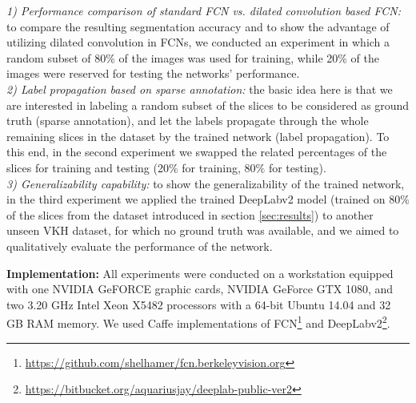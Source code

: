\documentclass[a4paper]{mva_style}
\begin{document}
\textit{1) Performance comparison of standard FCN vs. dilated convolution based FCN:} to compare the resulting segmentation accuracy and to show the advantage of utilizing dilated convolution in FCNs, we conducted an experiment in which a random subset of 80\% of the images was used for training, while 20\% of the images were reserved for testing the networks' performance. %
\\
\indent\textit{2) Label propagation based on sparse annotation:} the basic idea here is that we are interested in labeling a random subset of the slices to be considered as ground truth (sparse annotation), and let the labels propagate through the whole remaining slices in the dataset by the trained network (label propagation).  To this end, in the second experiment we swapped the related percentages of the slices for training and testing (20$\%$ for training, 80$\%$ for testing).%
\\
\indent\textit{3) Generalizability capability:} to show the generalizability of the trained network, in the third experiment we applied the trained DeepLabv2 model (trained on 80$\%$ of the slices from the dataset introduced in section \ref{sec:results}) to another unseen VKH dataset, for which no ground truth was available, and we aimed to qualitatively evaluate the performance of the network.

\textbf{Implementation:} All experiments were conducted on a workstation equipped with one NVIDIA GeFORCE graphic cards, NVIDIA GeForce GTX 1080,  and two 3.20 GHz Intel Xeon X5482  processors with a 64-bit Ubuntu 14.04 and 32 GB RAM memory. We used Caffe implementations \cite{jia2014caffe} of FCN\footnote{\url{https://github.com/shelhamer/fcn.berkeleyvision.org}} and DeepLabv2\footnote{\url{https://bitbucket.org/aquariusjay/deeplab-public-ver2}}.%
\end{document}
